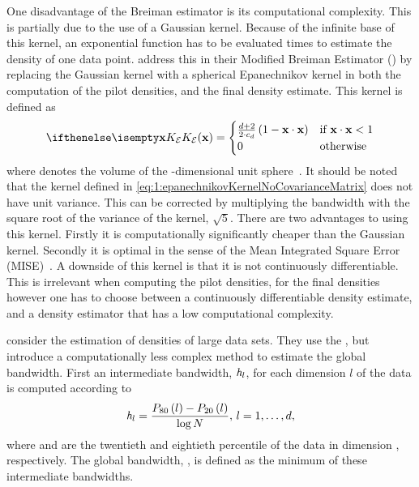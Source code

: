 	One disadvantage of the Breiman estimator is its computational complexity. This is partially due to the use of a Gaussian kernel. Because of the infinite base of this kernel, an exponential function has to be evaluated \varNumPatterns times to estimate the density of one data point.
	\textcite{wilkinson1995dataplot} address this in their Modified Breiman Estimator (\mbe) by replacing the Gaussian kernel with a spherical Epanechnikov kernel in both the computation of the pilot densities, and the final density estimate. This kernel is defined as
	\begin{equation}\label{eq:1:epanechnikovKernelNoCovarianceMatrix}
		\varKernel[\varEpan]{\varPattern} =
		\begin{cases}
			\frac{\varDim + 2}{2\cdot\varUnitSphere{\varDim}} \left( 1 - \varPattern \cdot \varPattern \right) & \text{if } \varPattern \cdot \varPattern < 1\\
			0 & \text{otherwise}
		\end{cases}
	\end{equation}
	 where \varUnitSphere{\varDim} denotes the volume of the \varDim-dimensional unit sphere~\cite{epanechnikov1969non}. It should be noted that the kernel defined in \cref{eq:1:epanechnikovKernelNoCovarianceMatrix} does not have unit variance. This can be corrected by multiplying the bandwidth \varBandwidth with the square root of the variance of the kernel, \mbox{\ie $\sqrt{5}$}. There are two advantages to using this kernel. Firstly it is computationally significantly cheaper than the Gaussian kernel. Secondly it is optimal in the sense of the Mean Integrated Square Error (MISE)~\cite{epanechnikov1969non}. A downside of this kernel is that it is not continuously differentiable. This is irrelevant when computing the pilot densities, for the final densities however one has to choose between a continuously differentiable density estimate, and a density estimator that has a low computational complexity.

	\textcite{ferdosi2011comparison} consider the estimation of densities of large data sets. They use the \mbe, but introduce a computationally less complex method to estimate the global bandwidth. First an intermediate bandwidth, $\mathit{h}_{l}$, for each dimension $l$ of the data is computed according to
	\begin{equation}\label{eq:1:ferdosiGeneralBandwidth}
			\mathit{h}_{l} = \frac{P_{80}\left( l \right) - P_{20}\left( l \right)}{\log N}, \, l = 1, \dotsc, d,
		\end{equation}
	where  and  are the twentieth and eightieth percentile of the data in dimension \itDim, respectively. The global bandwidth, \varBandwidth, is defined as the minimum of these intermediate bandwidths.

